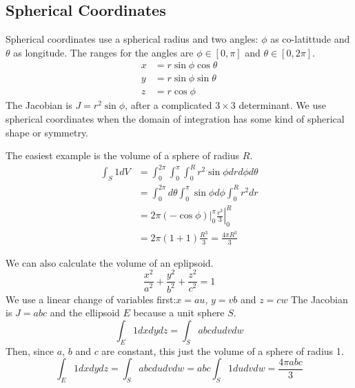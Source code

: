 \documentclass[fleqn,letterpaper]{report}
\begin{document}
\subsection{Spherical Coordinates}
\label{spherical}

Spherical coordinates use a spherical radius and two angles:
$\phi$ as co-latittude and $\theta$ as longitude. The ranges
for the angles are $\phi \in [0,\pi]$ and $\theta \in [0,
2\pi]$. 
\begin{align*}
x & = r \sin \phi \cos \theta \\
y & = r \sin \phi \sin \theta \\
z & = r \cos \phi
\end{align*}
The Jacobian is $J = r^2 \sin \phi$, after a complicated $3
\times 3$ determinant. We use spherical coordinates when the
domain of integration has some kind of spherical shape or
symmetry.

\begin{example}
The easiest example is the volume of a sphere of radius $R$.
\begin{align*}
\int_S 1 dV & = \int_0^{2\pi} \int_0^{\pi} \int_0^R r^2 \sin
\phi dr d\phi d\theta \\
& = \int_0^{2\pi} d\theta \int_0^{\pi} \sin \phi d \phi
\int_0^R r^2 dr \\
& = 2\pi \left. \left( -\cos \phi \right) \right|_0^{\pi} \left.
\frac{r^3}{3} \right|_0^R \\
& = 2\pi ( 1+1) \frac{R^3}{3} = \frac{4\pi R^3}{3}
\end{align*}
\end{example}

\begin{example}
We can also calculate the volume of an eplipsoid.
\begin{equation*}
\frac{x^2}{a^2} + \frac{y^2}{b^2} + \frac{z^2}{c^2} = 1 
\end{equation*}
We use a linear change of variables first:$x =au$, $y = vb$ and $z=cw$
The Jacobian is $J = abc$ and the ellipsoid $E$ because a unit
sphere $S$.
\begin{equation*}
\int_E 1 dx dy dz = \int_S abc dudvdw
\end{equation*}
Then, since $a$, $b$ and $c$ are constant, this just the
volume of a sphere of radius 1.
\begin{equation*}
\int_E 1 dx dy dz = \int_S abc dudvdw = abc \int_S 1 du dv
dw = \frac{4\pi abc}{3}
\end{equation*}
\end{example}
\end{document}

